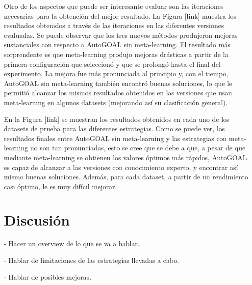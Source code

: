 Otro de los aspectos que puede ser interesante evaluar son las iteraciones necesarias para la obtención del mejor resultado. La Figura [link] muestra los resultados obtenidos a través de las iteraciones en las diferentes versiones evaluadas. Se puede observar que los tres nuevos métodos produjeron mejoras sustanciales con respecto a AutoGOAL sin meta-learning. El resultado más sorprendente es que meta-learning produjo mejoras drásticas a partir de la primera configuración que seleccionó y que se prolongó hasta el final del experimento. La mejora fue más pronunciada al principio y, con el tiempo, AutoGOAL sin meta-learning también encontró buenas soluciones, lo que le permitió alcanzar los mismos resultados obtenidos en las versiones que usan meta-learning en algunos datasets (mejorando así su clasificación general).

En la Figura [link] se muestran los resultados obtenidos en cada uno de los datasets de prueba para las diferentes estrategias. Como se puede ver, los resultados finales entre AutoGOAL sin meta-learning y las estrategias con meta-learning no son tan pronunciadas, esto se cree que se debe a que, a pesar de que mediante meta-learning se obtienen los valores óptimos más rápidos, AutoGOAL es capaz de alcanzar a las versiones con conocimiento experto, y encontrar así mismo buenas soluciones. Además, para cada dataset, a partir de un rendimiento casi óptimo, le es muy difícil mejorar.

\section{Discusión}

- Hacer un overview de lo que se va a hablar.

- Hablar de limitaciones de las estrategias llevadas a cabo.

- Hablar de posibles mejoras.